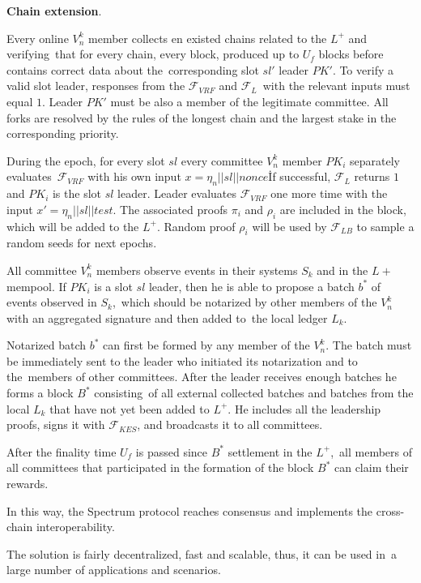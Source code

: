 \begin{legal}
    \item \textbf{Chain extension}.
    \begin{legal}

        \item Every online $V^k_n$ member collects en existed chains related to the $L^+$ and verifying\
        that for every chain, every block, produced up to $U_f$ blocks before contains correct data about the\
        corresponding slot $sl'$ leader $PK'$.
        To verify a valid slot leader, responses from the ${\mathcal{F}}_{VRF}$ and ${\mathcal{F}}_{L}$\
        with the relevant inputs must equal $1$.
        Leader $PK'$ must be also a member of the legitimate committee.
        All forks are resolved by the rules of the longest chain and the largest stake in the corresponding priority.

        \item During the epoch, for every slot $sl$ every committee $V^k_n$ member $PK_i$ separately evaluates\
        ${\mathcal{F}}_{VRF}$ with his own input ${x = \eta_n || sl || \textit{nonce}}$\.
        If successful, ${\mathcal{F}}_{L}$ returns $1$ and $PK_i$ is the slot $sl$ leader.
        Leader evaluates ${\mathcal{F}}_{VRF}$ one more time with the input ${x' = \eta_n || sl || \textit{test}}$.
        The associated proofs $\pi_i$ and $\rho_i$ are included in the block, which will be added to the $L^+$.
        Random proof $\rho_i$ will be used by ${\mathcal{F}}_{LB}$ to sample a random seeds for next epochs.

        \item All committee $V^k_n$ members observe events in their systems $S_k$ and in the $L+$ mempool.
        If $PK_i$ is a slot $sl$ leader, then he is able to propose a batch $b^*$ of events observed in $S_k$,\
        which should be notarized by other members of the $V^k_n$ with an aggregated signature and then added to\
        the local ledger $L_k$.

        \item Notarized batch $b^*$ can first be formed by any member of the $V^k_n$.
        The batch must be immediately sent to the leader who initiated its notarization and to the\
        members of other committees.
        After the leader receives enough batches he forms a block  $B^*$ consisting\
        of all external collected batches and batches from the local $L_k$ that have not yet been added to $L^+$.
        He includes all the leadership proofs, signs it with ${\mathcal{F}}_{KES}$, and broadcasts it to all committees.

        \item After the finality time $U_f$ is passed since $B^*$ settlement in the $L^+$,\
        all members of all committees that participated in the formation of the block $B^*$ can claim their rewards.
    \end{legal}
\end{legal}

In this way, the Spectrum protocol reaches consensus and implements the cross-chain interoperability.

The solution is fairly decentralized, fast and scalable, thus, it can be used in\
a large number of applications and scenarios.